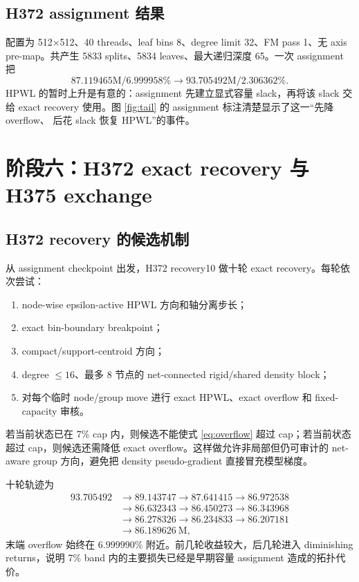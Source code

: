 \documentclass[UTF8,a4paper,11pt]{ctexrep}
\begin{document}
\section{H372 assignment 结果}
配置为 512$\times$512、40 threads、leaf bins 8、degree limit 32、FM pass 1、无
axis pre-map。共产生 5833 splits、5834 leaves、最大递归深度 65。一次 assignment
把
\[
 87.119465\text{M}/6.999958\%
  \longrightarrow93.705492\text{M}/2.306362\%.
\]
HPWL 的暂时上升是有意的：assignment 先建立显式容量 slack，再将该 slack 交给 exact
recovery 使用。图 \ref{fig:tail} 的 assignment 标注清楚显示了这一“先降 overflow、
后花 slack 恢复 HPWL”的事件。

\chapter{阶段六：H372 exact recovery 与 H375 exchange}

\section{H372 recovery 的候选机制}
从 assignment checkpoint 出发，H372 recovery10 做十轮 exact recovery。每轮依次尝试：
\begin{enumerate}
  \item node-wise epsilon-active HPWL 方向和轴分离步长；
  \item exact bin-boundary breakpoint；
  \item compact/support-centroid 方向；
  \item degree $\le16$、最多 8 节点的 net-connected rigid/shared density block；
  \item 对每个临时 node/group move 进行 exact HPWL、exact overflow 和 fixed-capacity 审核。
\end{enumerate}
若当前状态已在 7\% cap 内，则候选不能使式 \eqref{eq:overflow} 超过 cap；若当前状态
超过 cap，则候选还需降低 exact overflow。这样做允许非局部但仍可审计的 net-aware group
方向，避免把 density pseudo-gradient 直接冒充模型梯度。

十轮轨迹为
\[
\begin{aligned}
  93.705492&\rightarrow89.143747\rightarrow87.641415\rightarrow86.972538\\
  &\rightarrow86.632343\rightarrow86.450273\rightarrow86.343968\\
  &\rightarrow86.278326\rightarrow86.234833\rightarrow86.207181\\
  &\rightarrow86.189626\ \text{M},
\end{aligned}
\]
末端 overflow 始终在 $6.999990\%$ 附近。前几轮收益较大，后几轮进入 diminishing
returns，说明 7\% band 内的主要损失已经是早期容量 assignment 造成的拓扑代价。
\end{document}

